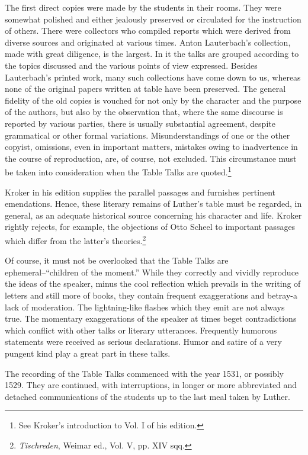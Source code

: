 The first direct copies were made by the students in their rooms. They
were somewhat polished and either jealously preserved or circulated for the
instruction of others. There were collectors who compiled reports which
were derived from diverse sources and originated at various times. Anton
Lauterbach’s collection, made with great diligence, is the largest. In it the
talks are grouped according to the topics discussed and the various points of
view expressed. Besides Lauterbach’s printed work, many such collections
have come down to us, whereas none of the original papers written at table
have been preserved. The general fidelity of the old copies is vouched for not
only by the character and the purpose of the authors, but also by the observation
that, where the same discourse is reported by various parties, there is
usually substantial agreement, despite grammatical or other formal variations.
Misunderstandings of one or the other copyist, omissions, even in important
matters, mistakes owing to inadvertence in the course of reproduction, are, of
course, not excluded. This circumstance must be taken into consideration
when the Table Talks are quoted.\footnote{See Kroker’s introduction to Vol. I of his edition.}


Kroker in his edition supplies the parallel passages and furnishes pertinent
emendations. Hence, these literary remains of Luther’s table must be regarded,
in general, as an adequate historical source concerning his character
and life. Kroker rightly rejects, for example, the objections of Otto
Scheel to important passages which differ from the latter’s theories.\footnote{\textit{Tischreden}, Weimar ed., Vol. V, pp. XIV sqq.}


Of course, it must not be overlooked that the Table Talks are
ephemeral--“children of the moment.” While they correctly and
vividly reproduce the ideas of the speaker, minus the cool reflection
which prevails in the writing of letters and still more of books, they
contain frequent exaggerations and betray-a lack of moderation. The
lightning-like flashes which they emit are not always true. The momentary
exaggerations of the speaker at times beget contradictions
which conflict with other talks or literary utterances. Frequently humorous
statements were received as serious declarations. Humor and
satire of a very pungent kind play a great part in these talks.

The recording of the Table Talks commenced with the year 1531,
or possibly 1529. They are continued, with interruptions, in longer or
more abbreviated and detached communications of the students up to
the last meal taken by Luther.

